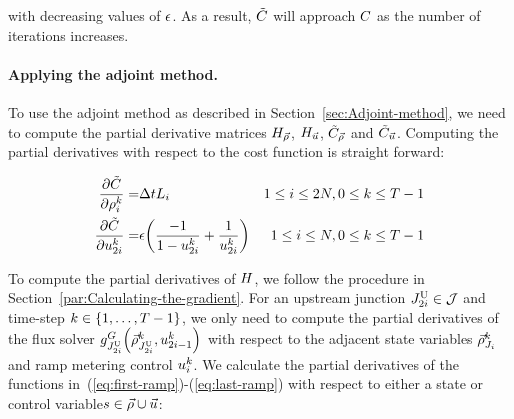 														
							with decreasing values of $\epsilon$. As a result, $\tilde{C}$
							will approach $C$ as the number of iterations increases.
														
														
							\paragraph{Applying the adjoint method.}
														
							To use the adjoint method as described in Section~\ref{sec:Adjoint-method},
							we need to compute the partial derivative matrices $H_{\vec{\rho}}$, $H_{\vec{u}}$,
							$\tilde{C}_{\vec{\rho}}$ and $\tilde{C}_{\vec{u}}$. Computing the partial
							derivatives with respect to the cost function is straight forward:
														
							\begin{eqnarray*}
								\pfrac{\tilde{\cost}}{\discrete{\link}{\tind}}= & \Delta tL_{i} & 1\le i\le2\nlinks,0\le k\le T-1\\
								\pfrac{\tilde{\cost}}{\ramp_{2\link}^{\tind}}= & \barrierTerm\left(\frac{-1}{1-\ramp_{2\link}^{\tind}}+\frac{1}{\ramp_{2\link}^{\tind}}\right) & 1\le i\le\nlinks,0\le k\le T-1
							\end{eqnarray*}
														
														
							To compute the partial derivatives of $H$, we follow the procedure
							in Section~\ref{par:Calculating-the-gradient}. For an upstream junction
							$J_{2i}^{\text{U}}\in\mathcal{J}$ and time-step $k\in\intrange 1{\ntime-1}$,
							we only need to compute the partial derivatives of the flux solver
							$\god_{\jup{2\link}}\left(\juncstate{\jup{2\link}}{\tind},\ramp_{2\link-1}^{\tind}\right)_{\text{}}$
							with respect to the adjacent state variables $\vec{\rho}_{J_{i}}^{k}$
							and ramp metering control $u_{i}^{k}$. We calculate the
							partial derivatives of the functions in~(\eqref{eq:first-ramp})-(\eqref{eq:last-ramp})
							with respect to either a state or control variable$s\in\vec{\rho}\cup\vec{u}$:
														
